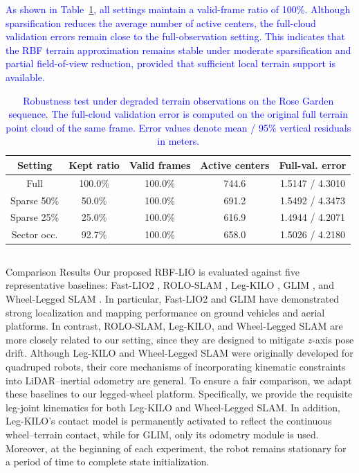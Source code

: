 \documentclass[journal,twoside,web]{ieeecolor}
\makeatletter
\newcommand{\cs}[1]{\textcolor{blue}{#1}}
\let\origsubsection\subsection
\def\subsection{\@ifstar\subsectionstarcolor\subsectioncolorcmd}
\def\subsectioncolorcmd#1{\origsubsection{\textcolor{subsectioncolor}{#1}}}
\def\subsectionstarcolor#1{\origsubsection*{#1}}
\makeatother
\begin{document}
\cs{As shown in Table~\ref{tab:terrain_observation_stress}, all settings maintain a valid-frame ratio of 100\%. Although sparsification reduces the average number of active centers, the full-cloud validation errors remain close to the full-observation setting. This indicates that the RBF terrain approximation remains stable under moderate sparsification and partial field-of-view reduction, provided that sufficient local terrain support is available.}

\begin{table}[!t]
\centering
\caption{\cs{Robustness test under degraded terrain observations on the Rose Garden sequence. The full-cloud validation error is computed on the original full terrain point cloud of the same frame. Error values denote mean / 95\% vertical residuals in meters.}}
\label{tab:terrain_observation_stress}
\footnotesize
\renewcommand{\arraystretch}{1.15}
\setlength{\tabcolsep}{3.0pt}
\begin{tabular}{|c|c|c|c|c|}
\hline
Setting & Kept ratio & Valid frames & Active centers & Full-val. error \\
\hline
Full & 100.0\% & 100.0\% & 744.6 & 1.5147 / 4.3010 \\

Sparse 50\% & 50.0\% & 100.0\% & 691.2 & 1.5492 / 4.3473 \\

Sparse 25\% & 25.0\% & 100.0\% & 616.9 & 1.4944 / 4.2071 \\

Sector occ. & 92.7\% & 100.0\% & 658.0 & 1.5026 / 4.2180 \\
\hline
\end{tabular}
\renewcommand{\arraystretch}{1.0}
\end{table}

\subsection{Comparison Results}
Our proposed RBF-LIO is evaluated against five representative baselines: Fast-LIO2 \cite{fastlio2}, ROLO-SLAM \cite{roloslam}, Leg-KILO \cite{leg-kilo}, GLIM \cite{glim}, and Wheel-Legged SLAM \cite{wl-slam}. In particular, Fast-LIO2 and GLIM have demonstrated strong localization and mapping performance on ground vehicles and aerial platforms. In contrast, ROLO-SLAM, Leg-KILO, and Wheel-Legged SLAM are more closely related to our setting, since they are designed to mitigate $z$-axis pose drift. Although Leg-KILO and Wheel-Legged SLAM were originally developed for quadruped robots, their core mechanisms of incorporating kinematic constraints into LiDAR--inertial odometry are general. To ensure a fair comparison, we adapt these baselines to our legged-wheel platform. Specifically, we provide the requisite leg-joint kinematics for both Leg-KILO and Wheel-Legged SLAM. In addition, Leg-KILO's contact model is permanently activated to reflect the continuous wheel--terrain contact, while for GLIM, only its odometry module is used. Moreover, at the beginning of each experiment, the robot remains stationary for a period of time to complete state initialization.
\end{document}
